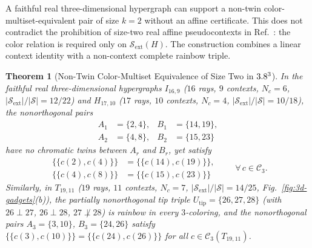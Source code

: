 \documentclass[aps,pra,reprint,superscriptaddress,longbibliography,nofootinbib,floatfix,10pt]{revtex4-2}
\newtheorem{theorem}{Theorem}
\theoremstyle{definition}\newtheorem{definition}[theorem]{Definition}
\theoremstyle{remark}\newtheorem{remark}[theorem]{Remark}
\newcommand{\Sc}{\mathcal S}\newcommand{\Cc}{\mathcal C}\newcommand{\Wc}{\mathcal W}
\begin{document}
A faithful real three-dimensional hypergraph can support a non-twin color-multiset-equivalent pair of size $k=2$ without an affine certificate. This does not contradict the prohibition of size-two real affine pseudocontexts in Ref.~\cite{2026-Navara-Svozil-pseudocontexts}: the color relation is required only on $\Sc_{\mathrm{ext}}(H)$. The construction combines a linear context identity with a non-context complete rainbow triple.

\begin{theorem}[Non-Twin Color-Multiset Equivalence of Size Two in $3.8^3$]\label{thm:size2-real}
In the faithful real three-dimensional hypergraphs $I_{16,9}$ ($16$ rays, $9$ contexts, $N_c=6$, $|\Sc_{\mathrm{ext}}|/|\Sc|=12/22$) and $H_{17,10}$ ($17$ rays, $10$ contexts, $N_c=4$, $|\Sc_{\mathrm{ext}}|/|\Sc|=10/18$), the nonorthogonal pairs
\begin{equation}\label{eq:I16-H17-size2}
\begin{aligned}
A_1&=\{2,4\},& B_1&=\{14,19\},\\
A_2&=\{4,8\},& B_2&=\{15,23\}
\end{aligned}
\end{equation}
have no chromatic twins between $A_r$ and $B_r$, yet satisfy
\begin{equation}\label{eq:I16-H17-multiset}
\begin{aligned}
\bigl\{\!\bigl\{c(2),c(4)\bigr\}\!\bigr\} &= \bigl\{\!\bigl\{c(14),c(19)\bigr\}\!\bigr\},\\
\bigl\{\!\bigl\{c(4),c(8)\bigr\}\!\bigr\} &= \bigl\{\!\bigl\{c(15),c(23)\bigr\}\!\bigr\}
\end{aligned}
\qquad \forall\, c\in\Cc_3.
\end{equation}
Similarly, in $T_{19,11}$ ($19$ rays, $11$ contexts, $N_c=7$, $|\Sc_{\mathrm{ext}}|/|\Sc|=14/25$, Fig.~\ref{fig:3d-gadgets}(b)), the partially nonorthogonal tip triple $U_{\mathrm{tip}}=\{26,27,28\}$ (with $26\perp 27$, $26\perp 28$, $27\not\perp 28$) is rainbow in every $3$-coloring, and the nonorthogonal pairs $A_3=\{3,10\}$, $B_3=\{24,26\}$ satisfy $\{\!\{c(3),c(10)\}\!\}=\{\!\{c(24),c(26)\}\!\}$ for all $c\in\Cc_3(T_{19,11})$.
\end{theorem}
\end{document}
